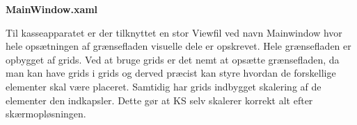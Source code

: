 \textbf{MainWindow.xaml}

Til kasseapparatet er der tilknyttet en stor Viewfil ved navn Mainwindow hvor hele opsætningen af grænsefladen visuelle dele er opskrevet. Hele grænsefladen er opbygget af grids. Ved at bruge grids er det nemt at opsætte grænsefladen, da man kan have grids i grids og derved præcist kan styre hvordan de forskellige elementer skal være placeret. Samtidig har grids indbygget skalering af de elementer den indkapsler. Dette gør at \gls{KS} selv skalerer korrekt alt efter skærmopløsningen.